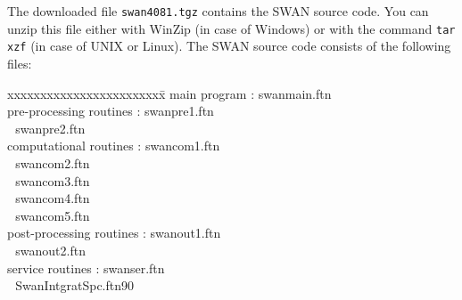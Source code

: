 \documentclass[12pt]{book}
\begin{document}
The downloaded file {\tt swan4081.tgz} contains the SWAN source code. You can unzip this
file either with WinZip (in case of Windows) or with the command {\tt tar xzf} (in case of
UNIX or Linux). The SWAN source code consists of the following files:
\begin{tabbing}
xxxxxxxxxxxxxxxxxxxxxxxx\= \kill
main program             \>:       swanmain.ftn \\
pre-processing routines  \>:       swanpre1.ftn \\
                         \> $\,\,$ swanpre2.ftn \\
computational routines   \>:       swancom1.ftn \\
                         \> $\,\,$ swancom2.ftn \\
                         \> $\,\,$ swancom3.ftn \\
                         \> $\,\,$ swancom4.ftn \\
                         \> $\,\,$ swancom5.ftn \\
post-processing routines \>:       swanout1.ftn \\
                         \> $\,\,$ swanout2.ftn \\
service routines         \>:       swanser.ftn \\
                         \> $\,\,$ SwanIntgratSpc.ftn90 \\
\end{tabbing}
\newpage
\end{document}

